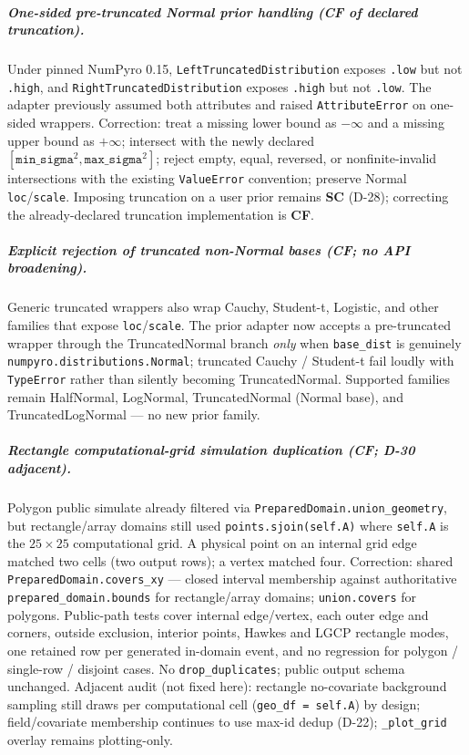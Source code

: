 \documentclass[
  10pt,
]{article}
\begin{document}
\subparagraph{One-sided pre-truncated Normal prior handling (CF of declared truncation).}
Under pinned NumPyro 0.15, \texttt{LeftTruncatedDistribution} exposes \texttt{.low} but not \texttt{.high}, and \texttt{RightTruncatedDistribution} exposes \texttt{.high} but not \texttt{.low}.
The adapter previously assumed both attributes and raised \texttt{AttributeError} on one-sided wrappers.
Correction: treat a missing lower bound as \(-\infty\) and a missing upper bound as \(+\infty\); intersect with the newly declared \([\texttt{min\_sigma}^2,\texttt{max\_sigma}^2]\); reject empty, equal, reversed, or nonfinite-invalid intersections with the existing \texttt{ValueError} convention; preserve Normal \texttt{loc}/\texttt{scale}.
Imposing truncation on a user prior remains \textbf{SC} (D-28); correcting the already-declared truncation implementation is \textbf{CF}.

\subparagraph{Explicit rejection of truncated non-Normal bases (CF; no API broadening).}
Generic truncated wrappers also wrap Cauchy, Student-t, Logistic, and other families that expose \texttt{loc}/\texttt{scale}.
The prior adapter now accepts a pre-truncated wrapper through the TruncatedNormal branch \emph{only} when \texttt{base\_dist} is genuinely \texttt{numpyro.distributions.Normal}; truncated Cauchy / Student-t fail loudly with \texttt{TypeError} rather than silently becoming TruncatedNormal.
Supported families remain HalfNormal, LogNormal, TruncatedNormal (Normal base), and TruncatedLogNormal --- no new prior family.

\subparagraph{Rectangle computational-grid simulation duplication (CF; D-30 adjacent).}
Polygon public simulate already filtered via \texttt{PreparedDomain.union\_geometry}, but rectangle/array domains still used \texttt{points.sjoin(self.A)} where \texttt{self.A} is the \(25\times 25\) computational grid.
A physical point on an internal grid edge matched two cells (two output rows); a vertex matched four.
Correction: shared \texttt{PreparedDomain.covers\_xy} --- closed interval membership against authoritative \texttt{prepared\_domain.bounds} for rectangle/array domains; \texttt{union.covers} for polygons.
Public-path tests cover internal edge/vertex, each outer edge and corners, outside exclusion, interior points, Hawkes and LGCP rectangle modes, one retained row per generated in-domain event, and no regression for polygon / single-row / disjoint cases.
No \texttt{drop\_duplicates}; public output schema unchanged.
Adjacent audit (not fixed here): rectangle no-covariate background sampling still draws per computational cell (\texttt{geo\_df = self.A}) by design; field/covariate membership continues to use max-id dedup (D-22); \texttt{\_plot\_grid} overlay remains plotting-only.
\end{document}
